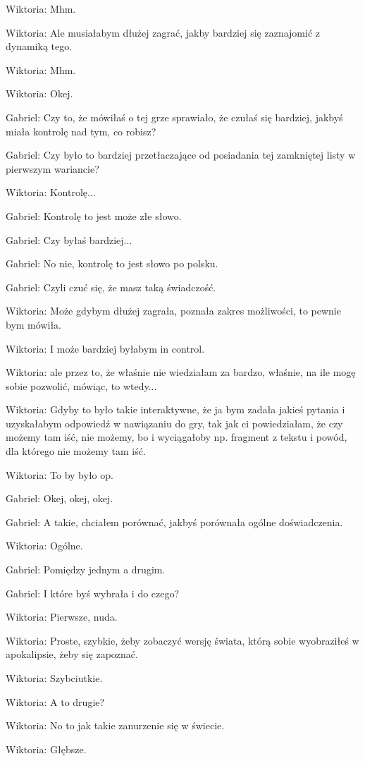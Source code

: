Wiktoria: Mhm.

Wiktoria: Ale musiałabym dłużej zagrać, jakby bardziej się zaznajomić z dynamiką tego.

Wiktoria: Mhm.

Wiktoria: Okej.

Gabriel: Czy to, że mówiłaś o tej grze sprawiało, że czułaś się bardziej, jakbyś miała kontrolę nad tym, co robisz?

Gabriel: Czy było to bardziej przetłaczające od posiadania tej zamkniętej listy w pierwszym wariancie?

Wiktoria: Kontrolę...

Gabriel: Kontrolę to jest może złe słowo.

Gabriel: Czy byłaś bardziej...

Gabriel: No nie, kontrolę to jest słowo po polsku.

Gabriel: Czyli czuć się, że masz taką świadczość.

Wiktoria: Może gdybym dłużej zagrała, poznała zakres możliwości, to pewnie bym mówiła.

Wiktoria: I może bardziej byłabym in control.

Wiktoria: ale przez to, że właśnie nie wiedziałam za bardzo, właśnie, na ile mogę sobie pozwolić, mówiąc, to wtedy...

Wiktoria: Gdyby to było takie interaktywne, że ja bym zadała jakieś pytania i uzyskałabym odpowiedź w nawiązaniu do gry, tak jak ci powiedziałam, że czy możemy tam iść, nie możemy, bo i wyciągałoby np. fragment z tekstu i powód, dla którego nie możemy tam iść.

Wiktoria: To by było op.

Gabriel: Okej, okej, okej.

Gabriel: A takie, chciałem porównać, jakbyś porównała ogólne doświadczenia.

Wiktoria: Ogólne.

Gabriel: Pomiędzy jednym a drugim.

Gabriel: I które byś wybrała i do czego?

Wiktoria: Pierwsze, nuda.

Wiktoria: Proste, szybkie, żeby zobaczyć wersję świata, którą sobie wyobraziłeś w apokalipsie, żeby się zapoznać.

Wiktoria: Szybciutkie.

Wiktoria: A to drugie?

Wiktoria: No to jak takie zanurzenie się w świecie.

Wiktoria: Głębsze.


